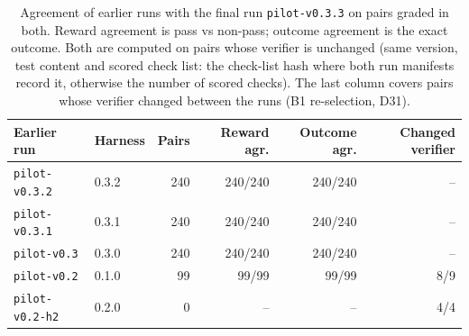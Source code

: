 \begin{table}[t]\centering\footnotesize
\caption{Agreement of earlier runs with the final run \texttt{pilot-v0.3.3} on pairs graded in both. Reward agreement is pass vs non-pass; outcome agreement is the exact outcome. Both are computed on pairs whose verifier is unchanged (same version, test content and scored check list: the check-list hash where both run manifests record it, otherwise the number of scored checks). The last column covers pairs whose verifier changed between the runs (B1 re-selection, D31).}\label{tab:reliability}
\begin{tabular}{llrrrr}\toprule Earlier run & Harness & Pairs & Reward agr. & Outcome agr. & Changed verifier \\\midrule
\texttt{pilot-v0.3.2} & 0.3.2 & 240 & 240/240 & 240/240 & -- \\
\texttt{pilot-v0.3.1} & 0.3.1 & 240 & 240/240 & 240/240 & -- \\
\texttt{pilot-v0.3} & 0.3.0 & 240 & 240/240 & 240/240 & -- \\
\texttt{pilot-v0.2} & 0.1.0 & 99 & 99/99 & 99/99 & 8/9 \\
\texttt{pilot-v0.2-h2} & 0.2.0 & 0 & -- & -- & 4/4 \\
\bottomrule\end{tabular}\end{table}
